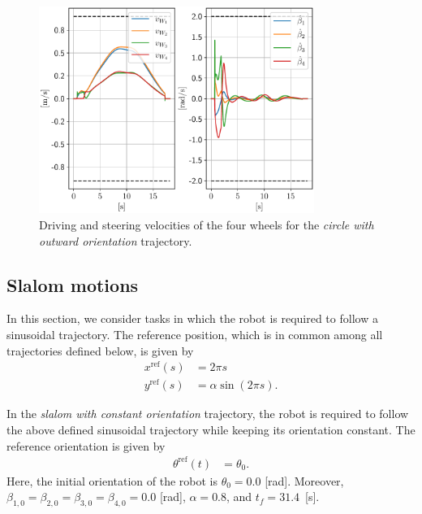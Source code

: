\begin{figure}
    \centering
    \includegraphics[width=0.8\textwidth]{figures/SWMR/simulations/circular_with_outward_orientation/wheels_velocities.pdf}
    \caption{Driving and steering velocities of the four wheels for the \textit{circle with outward orientation} trajectory.}
    \label{fig:simulations:circle-with-outward-orientation:wheel-velocities}
\end{figure}

\subsection{Slalom motions}
In this section, we consider tasks in which the robot is required to follow
a sinusoidal trajectory. The reference position, which is in common among all
trajectories defined below, is given by
\begin{subequations}
\begin{align*}
    x^{\mathrm{ref}}(s) &= 2 \pi s \\
    y^{\mathrm{ref}}(s) &= \alpha \sin(2 \pi s).
\end{align*}
\end{subequations}

In the \textit{slalom with constant orientation} trajectory, the robot is
required to follow the above defined sinusoidal trajectory while keeping its
orientation constant. The reference orientation is given by
\begin{subequations}
\begin{align*}
    \theta^{\mathrm{ref}}(t) &= \theta_0.
\end{align*}
\end{subequations}
Here, the initial orientation of the robot is $\theta_0=0.0$ [rad].
Moreover, $\beta_{1,0}=\beta_{2,0}=\beta_{3,0}=\beta_{4,0}=0.0$ [rad],
$\alpha=0.8$, and $t_f=31.4$~[s].

